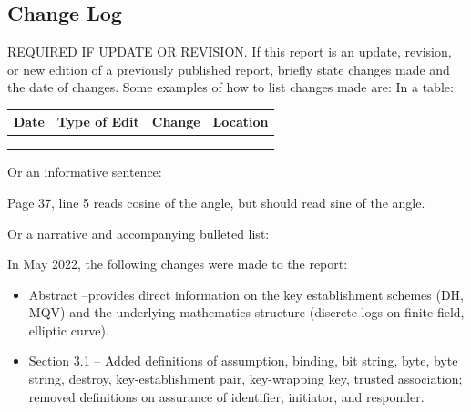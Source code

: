 \begin{appendices}
\section{Change Log}
\label{app:log}
REQUIRED IF UPDATE OR REVISION. If this report is an update, revision, or new edition of a previously published report, briefly state changes made and the date of changes. Some examples of how to list changes made are:
In a table:
\begin{table}[H]
\begin{tabular}{|l|l|l|l|}
\hline
Date & Type of Edit & Change & Location \\ \hline
     &              &        &          \\ \hline
     &              &        &          \\ \hline
     &              &        &          \\ \hline
\end{tabular}
\end{table}
Or an informative sentence:
\begin{tcolorbox}
Page 37, line 5 reads cosine of the angle, but should read sine of the angle.
\end{tcolorbox}
Or a narrative and accompanying bulleted list:

\vspace{12pt}
In May 2022, the following changes were made to the report:
\begin{itemize}
\item Abstract –provides direct information on the key establishment schemes (DH, MQV) and the underlying mathematics structure (discrete logs on finite field, elliptic curve).
\item Section 3.1 – Added definitions of assumption, binding, bit string, byte, byte string, destroy, key-establishment pair, key-wrapping key, trusted association; removed definitions on assurance of identifier, initiator, and responder.
\end{itemize}
\end{appendices}

